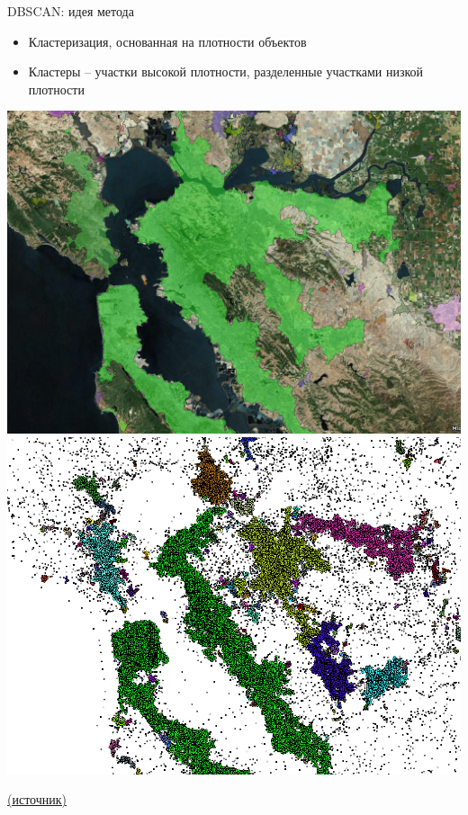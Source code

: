 \documentclass[10pt]{beamer}
\begin{document}
\begin{frame}{DBSCAN: идея метода}

\begin{itemize}
\item Кластеризация, основанная на плотности объектов
\item Кластеры -- участки высокой плотности, разделенные участками низкой плотности
\end{itemize}

\vspace{1em}
\begin{center}
\includegraphics[height=0.4\textheight]{images/dbscan1.png}
\includegraphics[height=0.4\textheight]{images/dbscan2.png}
\end{center}
\href{http://biarri.com/spatial-clustering-in-c-post-2-of-5-running-dbscan/}{(источник)}

\end{frame}
\end{document}
